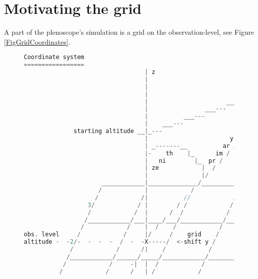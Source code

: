 \documentclass[a4paper,12pt,oneside]{article}
\begin{document}
\section{Motivating the grid}
\label{SecMotivatingTheGrid}
%
A part of the plenoscope's simulation is a grid on the observation-level, see Figure \ref{FigGridCoordinates}.
%
\begin{figure}
\begin{lstlisting}[language=C,basicstyle=\tiny\ttfamily]
Coordinate system
=================
                                  | z
                                  |                               starting pos.
                                  |                                  ___---O
                                  |                            ___---    / |
                                  |                      ___---     n  /   |
                                  |                ___---         io /     |
                                  |          ___---             ct /       |
                                  |    ___---                 re /         |
              starting altitude __|_---                     di /           |
                                  |                       y- /             |
                                  | _-------__          ar /               |
                                  |-    th    |_      im /                 |
                                  |   ni        |_  pr /                   |
                                  | ze            |  /                     |
                                  |               |/                       |
                      ____________|______________/________________________ |
                     /            |            /            /            / |
                    /            /|          //            /            /  |
                  3/            / |        / /            /            /   |
                  /            /  |      /  /            /            /    |
                 /____________/___|____/___/____________/____________/     |
                /            /    |  /    /            /            /      |
obs. level     /            /     |/     /    grid    /            /       |
altitude -  -2/-  -  -  -  /  -  -X-----/  <-shift y /            /        |
             /            /      /|    /            /            /         |
            /____________/______/_____/____________/____________/          |
           /            /     -|  |  /            /            /           |
          /            /      /   | /            /            /            |

\end{lstlisting}
\end{figure}
\end{document}
